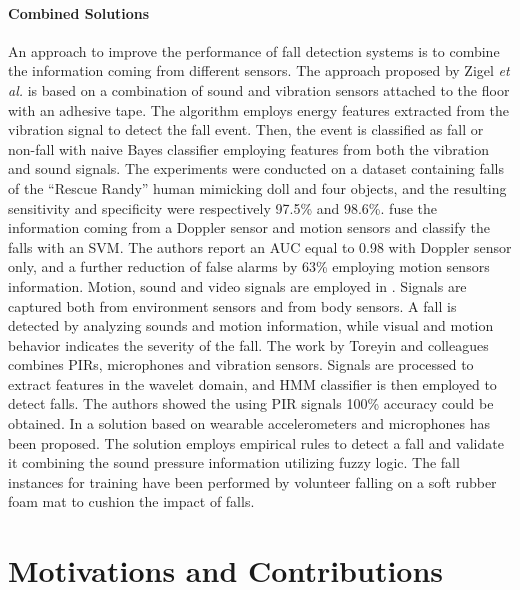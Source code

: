 \paragraph{Combined Solutions}
An approach to improve the performance of fall detection systems is to combine the information coming from different sensors. The approach proposed by Zigel \textit{et al.} \cite{zigel2009method} is based on a combination of sound and vibration sensors attached to the floor with an adhesive tape. The algorithm employs energy features extracted from the vibration signal to detect the fall event. Then, the event is classified as fall or non-fall with naive Bayes classifier employing features from both the vibration and sound signals. The experiments were conducted on a dataset containing falls of the ``Rescue Randy'' human mimicking doll and four objects, and the resulting sensitivity and specificity were respectively 97.5\% and 98.6\%. \cite{Liu2014} fuse the information coming from a Doppler sensor and motion sensors and classify the falls with an SVM. The authors report an AUC equal to 0.98 with Doppler sensor only, and a further reduction of false alarms by 63\% employing motion sensors information. Motion, sound and video signals are employed in \cite{Doukas2011}. Signals are captured both from environment sensors and from body sensors. A fall is detected by analyzing sounds and motion information, while visual and motion behavior indicates the severity of the fall. The work by Toreyin and colleagues \cite{Toreyin2008} combines PIRs, microphones and vibration sensors. Signals are processed to extract features in the wavelet domain, and HMM classifier is then employed to detect falls. The authors showed the using PIR signals 100\% accuracy could be obtained.
In \cite{er2018non} a solution based on wearable accelerometers and microphones has been proposed. The solution employs empirical rules to detect a fall and validate it combining the sound pressure information utilizing fuzzy logic. The fall instances for training have been performed by volunteer falling on a soft rubber foam mat to cushion the impact of falls.

\section{Motivations and Contributions}

